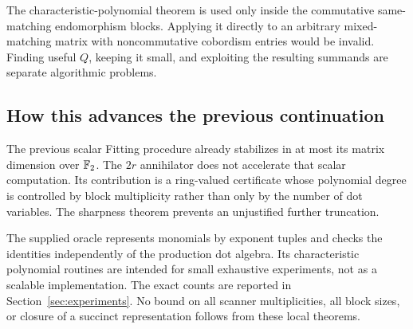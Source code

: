 The characteristic-polynomial theorem is used only inside the commutative
same-matching endomorphism blocks. Applying it directly to an arbitrary
mixed-matching matrix with noncommutative cobordism entries would be invalid.
Finding useful $Q$, keeping it small, and exploiting the resulting summands
are separate algorithmic problems.

\subsection{How this advances the previous continuation}

The previous scalar Fitting procedure already stabilizes in at most its
matrix dimension over $\mathbb F_2$. The $2r$ annihilator does not accelerate that
scalar computation. Its contribution is a ring-valued certificate whose
polynomial degree is controlled by block multiplicity rather than only by
the number of dot variables. The sharpness theorem prevents an unjustified
further truncation.

The supplied oracle represents monomials by exponent tuples and checks the
identities independently of the production dot algebra. Its characteristic
polynomial routines are intended for small exhaustive experiments, not as a
scalable implementation. The exact counts are reported in
Section~\ref{sec:experiments}. No bound on all scanner multiplicities,
all block sizes, or closure of a succinct representation follows from
these local theorems.
